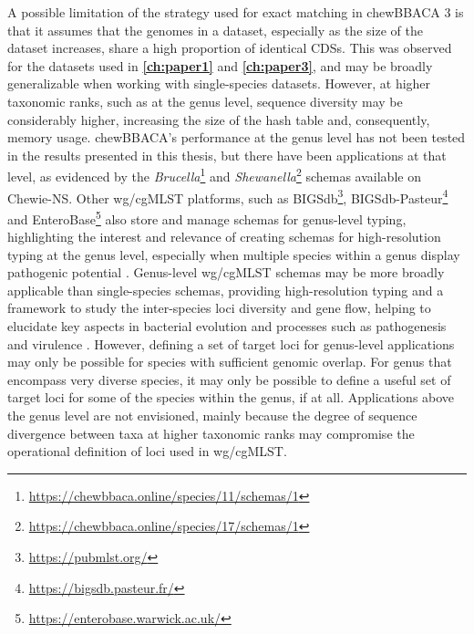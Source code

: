 A possible limitation of the strategy used for exact matching in chewBBACA 3 is that it assumes that the genomes in a dataset, especially as the size of the dataset increases, share a high proportion of identical \acp{CDS}. This was observed for the datasets used in \textbf{\autoref{ch:paper1}} and \textbf{\autoref{ch:paper3}}, and may be broadly generalizable when working with single-species datasets. However, at higher taxonomic ranks, such as at the genus level, sequence diversity may be considerably higher, increasing the size of the hash table and, consequently, memory usage. chewBBACA's performance at the genus level has not been tested in the results presented in this thesis, but there have been applications at that level, as evidenced by the \textit{Brucella}\footnote{\url{https://chewbbaca.online/species/11/schemas/1}} \cite{abdel-glil_core_2022} and \textit{Shewanella}\footnote{\url{https://chewbbaca.online/species/17/schemas/1}} schemas available on \ac{Chewie-NS}. Other \ac{wg/cgMLST} platforms, such as \ac{BIGSdb}\footnote{\url{https://pubmlst.org/}}, BIGSdb-Pasteur\footnote{\url{https://bigsdb.pasteur.fr/}} and EnteroBase\footnote{\url{https://enterobase.warwick.ac.uk/}} also store and manage schemas for genus-level typing, highlighting the interest and relevance of creating schemas for high-resolution typing at the genus level, especially when multiple species within a genus display pathogenic potential \cite{abdel-glil_core_2022, guglielmini_genus-wide_2019, pearce_proposed_2020, savin_genus-wide_2019}. Genus-level \ac{wg/cgMLST} schemas may be more broadly applicable than single-species schemas, providing high-resolution typing and a framework to study the inter-species loci diversity and gene flow, helping to elucidate key aspects in bacterial evolution and processes such as pathogenesis and virulence \cite{xie_inter-species_2024, dabernig-heinz_core_2024}. However, defining a set of target loci for genus-level applications may only be possible for species with sufficient genomic overlap. For genus that encompass very diverse species, it may only be possible to define a useful set of target loci for some of the species within the genus, if at all. Applications above the genus level are not envisioned, mainly because the degree of sequence divergence between taxa at higher taxonomic ranks may compromise the operational definition of loci used in \ac{wg/cgMLST}.

